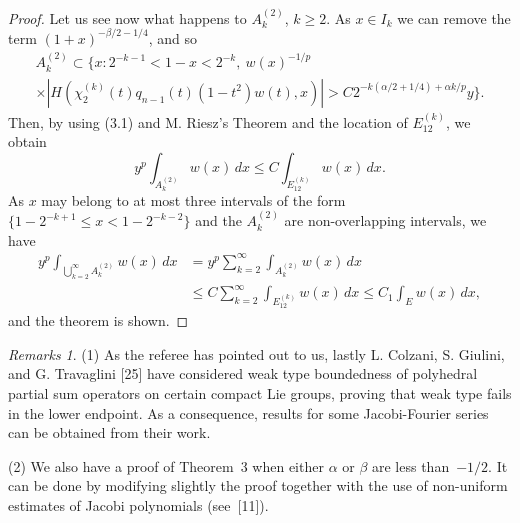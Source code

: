 \documentclass[10pt,a4paper]{article}
\theoremstyle{plain}
\theoremstyle{remark}
\newtheorem*{remReferee}{Remarks}
\begin{document}
\begin{proof}
Let us see now what happens to $A_{k}^{(2)}$, $k \geq 2$.
As $x \in I_{k}$ we can remove the term $(1+x)^{-\beta/2-1/4}$,
and so
\begin{multline*}
A_{k}^{(2)} \subset \{ x : 2^{-k-1} < 1-x < 2^{-k},\ w(x)^{-1/p} \\
\times |H(\chi_{2}^{(k)}(t)q_{n-1}(t)(1-t^{2})w(t),x)|
> C 2^{-k(\alpha/2+1/4)+\alpha k/p} y \}.
\end{multline*}
Then, by using (3.1) and M. Riesz's Theorem and the location
of $E_{12}^{(k)}$, we obtain
$$
y^{p} \int_{A_{k}^{(2)}} w(x)\,dx \leq C \int_{E_{12}^{(k)}} w(x)\,dx.
$$
As $x$ may belong to at most three intervals of the form
$\{ 1-2^{-k+1} \leq x < 1-2^{-k-2} \}$ and the
$A_{k}^{(2)}$ are non-overlapping intervals, we have
\begin{align*}
y^{p} \int_{\bigcup_{k=2}^{\infty} A_{k}^{(2)}} w(x)\,dx
&= y^{p} \sum_{k=2}^{\infty} \int_{A_{k}^{(2)}} w(x)\,dx \\
&\leq C \sum_{k=2}^{\infty} \int_{E_{12}^{(k)}} w(x)\,dx
\leq C_{1} \int_{E} w(x)\,dx,
\end{align*}
and the theorem is shown.
\end{proof}

\begin{remReferee}
(1) As the referee has pointed out to us,
lastly L. Colzani, S. Giulini, and G. Travaglini [25] have considered weak
type boundedness of polyhedral partial sum operators on certain
compact Lie groups, proving that weak type fails in the lower
endpoint. As a consequence, results for some Jacobi-Fourier series
can be obtained from their work.

(2) We also have a proof of Theorem~3 when either $\alpha$ or
$\beta$ are less than~$-1/2$. It can be done by modifying slightly
the proof together with the use of non-uniform estimates of Jacobi
polynomials (see~[11]).
\end{remReferee}
\end{document}
